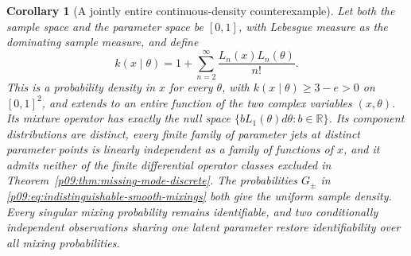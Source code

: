 \documentclass[11pt,letterpaper]{article}
\newtheorem{corollary}[theorem]{Corollary}
\theoremstyle{definition}
\theoremstyle{remark}
\newcommand{\1}{\mathbf 1}
\begin{document}
\begin{corollary}[A jointly entire continuous-density counterexample]
\label{p09:cor:entire-continuous-counterexample}
Let both the sample space and the parameter space be $[0,1]$, with
Lebesgue measure as the dominating sample measure, and define
\begin{equation}
 k(x\mid\theta)
   =1+\sum_{n=2}^{\infty}\frac{L_n(x)L_n(\theta)}{n!}.
 \label{p09:eq:continuous-missing-mode-kernel}\end{equation}
This is a probability density in $x$ for every $\theta$, with
$k(x\mid\theta)\ge3-e>0$ on $[0,1]^2$, and extends to an entire
function of the two complex variables $(x,\theta)$.
Its mixture operator has exactly the null space
$\{bL_1(\theta)d\theta:b\in\mathbb R\}$.
Its component distributions are distinct, every finite family of
parameter jets at distinct parameter points is linearly independent
as a family of functions of $x$, and it admits neither of the finite
differential operator classes excluded in
Theorem~\ref{p09:thm:missing-mode-discrete}.
The probabilities $G_\pm$ in
\eqref{p09:eq:indistinguishable-smooth-mixings} both give the uniform sample
density.  Every singular mixing probability remains identifiable, and
two conditionally independent observations sharing one latent
parameter restore identifiability over all mixing probabilities.
\end{corollary}
\end{document}
